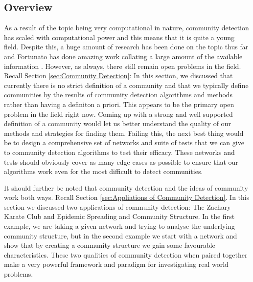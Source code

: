 \subsection{Overview}
As a result of the topic being very computational in nature, community detection has scaled with computational power and this means that it is quite a young field. Despite this, a huge amount of research has been done on the topic thus far and Fortunato has done amazing work collating a large amount of the available information \cite{fortunato}. However, as always, there still remain open problems in the field. Recall Section \ref{sec:Community Detection}: In this section, we discussed that currently there is no strict definition of a community and that we typically define communities by the results of community detection algorithms and methods rather than having a definiton a priori. This appears to be the primary open problem in the field right now. Coming up with a strong and well supported definition of a community would let us better understand the quality of our methods and strategies for finding them. Failing this, the next best thing would be to design a comprehensive set of networks and suite of tests that we can give to community detection algorithms to test their efficacy. These networks and tests should obviously cover as many edge cases as possible to ensure that our algorithms work even for the most difficult to detect communities. 

It should further be noted that community detection and the ideas of community work both ways. Recall Section \ref{sec:Appliations of Community Detection}. In this section we discussed two applications of community detection: The Zachary Karate Club and Epidemic Spreading and Community Structure. In the first example, we are taking a given network and trying to analyse the underlying community structure, but in the second example we start with a network and show that by creating a community structure we gain some favourable characteristics. These two qualities of community detection when paired together make a very powerful framework and paradigm for investigating real world problems.

